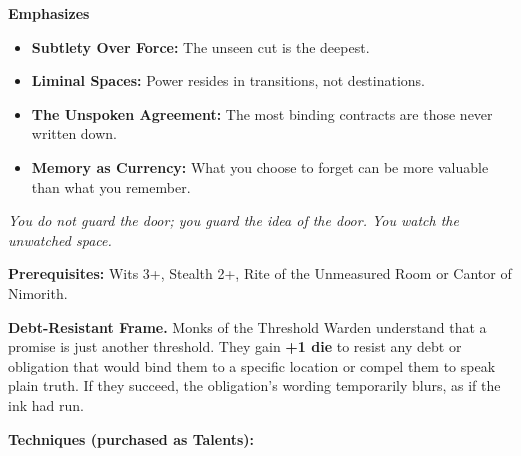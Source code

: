\noindent\textbf{Emphasizes}
\begin{itemize}
  \item \textbf{Subtlety Over Force:} The unseen cut is the deepest.
  \item \textbf{Liminal Spaces:} Power resides in transitions, not destinations.
  \item \textbf{The Unspoken Agreement:} The most binding contracts are those never written down.
  \item \textbf{Memory as Currency:} What you choose to forget can be more valuable than what you remember.
\end{itemize}

\begin{tcolorbox}[colback=black!5,colframe=gray!70!black,title=\textbf{Threshold Warden (Nimorith)},breakable]
  \emph{You do not guard the door; you guard the idea of the door. You watch the unwatched space.}

  \vspace{2mm}
  \noindent\textbf{Prerequisites:} Wits 3+, Stealth 2+, Rite of the Unmeasured Room or Cantor of Nimorith.

  \vspace{2mm}
  \noindent\textbf{Debt-Resistant Frame.} Monks of the Threshold Warden understand that a promise is just another threshold. They gain \textbf{+1 die} to resist any debt or obligation that would bind them to a specific location or compel them to speak plain truth. If they succeed, the obligation's wording temporarily blurs, as if the ink had run.

  \vspace{2mm}
  \noindent\textbf{Techniques (purchased as Talents):}


\end{tcolorbox}
